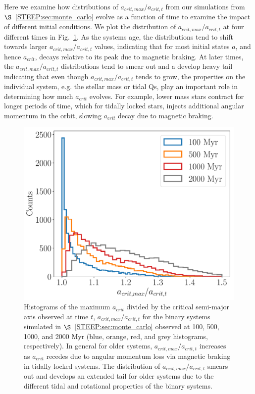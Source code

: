 Here we examine how distributions of $a_{crit,max}/a_{crit,t}$ from our simulations from $\S$~\ref{STEEP:sec:monte_carlo} evolve as a function of time to examine the impact of different initial conditions.  We plot the distribution of $a_{crit,max}/a_{crit,t}$ at four different times in Fig.~\ref{STEEP:fig:acrit_hist}.  As the systems age, the distributions tend to shift towards larger $a_{crit,max}/a_{crit,t}$ values, indicating that for most initial states $a$, and hence $a_{crit}$, decays relative to its peak due to magnetic braking.  At later times, the $a_{crit,max}/a_{crit,t}$ distributions tend to smear out and a develop heavy tail indicating that even though $a_{crit,max}/a_{crit,t}$ tends to grow, the properties on the individual system, e.g. the stellar mass or tidal Qs, play an important role in determining how much $a_{crit}$ evolves.  For example, lower mass stars contract for longer periods of time, which for tidally locked stars, injects additional angular momentum in the orbit, slowing $a_{crit}$ decay due to magnetic braking.

\begin{figure}
	\includegraphics[width=\columnwidth]{acrit_hist.pdf}
    \caption{Histograms of the maximum $a_{crit}$ divided by the critical semi-major axis observed at time $t$, $a_{crit,max}/a_{crit,t}$ for the binary systems simulated in $\S$~\ref{STEEP:sec:monte_carlo} observed at 100, 500, 1000, and 2000 Myr (blue, orange, red, and grey histograms, respectively).  In general for older systems, $a_{crit,max}/a_{crit,t}$ increases as $a_{crit}$ recedes due to angular momentum loss via magnetic braking in tidally locked systems.  The distribution of $a_{crit,max}/a_{crit,t}$ smears out and develops an extended tail for older systems due to the different tidal and rotational properties of the binary systems.}
    \label{STEEP:fig:acrit_hist}
\end{figure}

